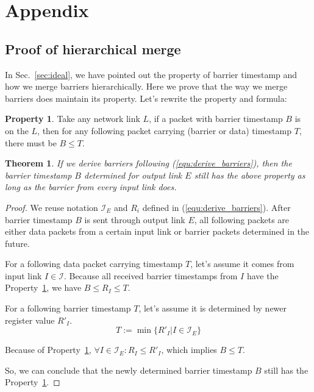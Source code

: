 \section{Appendix}
\newtheorem{theorem}{Theorem}[subsection]
\theoremstyle{definition}
\newtheorem{definition}{Definition}[subsection]
\newtheorem{property}{Property}[subsection]
\newtheorem*{assump}{Assumption}
\newtheorem*{notation}{Notation}
\newtheorem{lemma}[theorem]{Lemma}
\theoremstyle{remark}
\newtheorem*{rem}{Remark}
\newtheorem*{conclusion}{Conclusion}
\newtheorem*{note}{Note}
\subsection{Proof of hierarchical merge}
\label{appx:hierarchical_merge}
In Sec.~\ref{sec:ideal}, we have pointed out the property of barrier timestamp and how we merge barriers hierarchically.
Here we prove that the way we merge barriers does maintain its property.
Let's rewrite the property and formula:
\begin{property}\label{prop:barrier}
	Take any network link $L$, if a packet with barrier timestamp $B$ is on the $L$, then for any following packet carrying (barrier or data) timestamp $T$, there must be $B \le T$.
\end{property}
\begin{theorem}
	If we derive barriers following (\ref{equ:derive_barriers}), then the barrier timestamp $B$ determined for output link $E$ still has the above property as long as the barrier from every input link does.
\end{theorem}
\begin{proof}
	We reuse notation $\mathcal{I}_E$ and $R_i$ defined in (\ref{equ:derive_barriers}).
	After barrier timestamp $B$ is sent through output link $E$, all following packets are either data packets from a certain input link or barrier packets determined in the future.

	For a following data packet carrying timestamp $T$, let's assume it comes from input link $I \in \mathcal{I}$.
	Because all received barrier timestamps from $I$ have the Property~\ref{prop:barrier}, we have $B \le R_I \le T$.

	For a following barrier timestamp $T$, let's assume it is determined by newer register value $R'_I$.
	$$T:=\min\{R'_I|I \in \mathcal{I}_E\}$$
	
	Because of Property~\ref{prop:barrier}, $\forall I \in \mathcal{I}_E:R_I \le R'_I$, which implies $B \le T$.

	So, we can conclude that the newly determined barrier timestamp $B$ still has the Property~\ref{prop:barrier}.
\end{proof}

